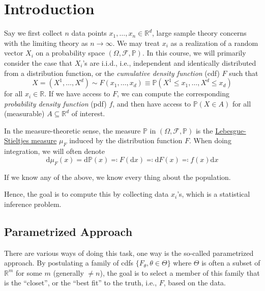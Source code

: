 \chapter{Introduction}
Say we first collect \(n\) data points \(x_1, \dots , x_n \in \mathbb{R} ^d\), large sample theory concerns with the limiting theory as \(n \to \infty \). We may treat \(x_i\) as a realization of a random vector \(X_i\) on a probability space \((\Omega , \mathscr{F} , \mathbb{P} )\). In this course, we will primarily consider the case that \(X_i\)'s are i.i.d., i.e., independent and identically distributed from a distribution function, or the \emph{cumulative density function} (cdf) \(F\) such that
\[
	X = (X^1, \dots , X^d) \sim F(x_1, \dots , x_d) \equiv \mathbb{P} (X^1 \leq x_1, \dots , X^d \leq x_d )
\]
for all \(x_i \in \mathbb{R} \). If we have access to \(F\), we can compute the corresponding \emph{probability density function} (pdf) \(f\), and then have access to \(\mathbb{P} (X \in A)\) for all (measurable) \(A \subseteq \mathbb{R} ^d\) of interest.

\begin{notation}
	In the measure-theoretic sense, the measure \(\mathbb{P} \) in \((\Omega , \mathscr{F} , \mathbb{P} )\) is the \href{https://en.wikipedia.org/wiki/Lebesgue-Stieltjes_integration}{Lebesgue-Stieltjes measure} \(\mu _F\) induced by the distribution function \(F\). When doing integration, we will often denote
	\[
		\mathrm{d} \mu _F (x) = \mathrm{d} \mathbb{P}(x) \eqqcolon F(\mathrm{d} x) \eqqcolon \mathrm{d} F(x) \eqqcolon f(x) \mathrm{d} x
	\]
\end{notation}

\begin{remark}
	If we know any of the above, we know every thing about the population.
\end{remark}

Hence, the goal is to compute this by collecting data \(x_i\)'s, which is a statistical inference problem.

\section{Parametrized Approach}
There are various ways of doing this task, one way is the so-called parametrized approach. By postulating a family of cdfs \(\{ F_\theta , \theta \in \Theta \} \) where \(\Theta \) is often a subset of \(\mathbb{R} ^m\) for some \(m\) (generally \(\neq n\)), the goal is to select a member of this family that is the ``closet'', or the ``best fit'' to the truth, i.e., \(F\), based on the data.

